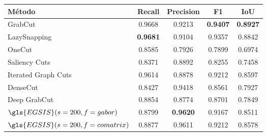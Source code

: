\begin{table}[!h]
    \centering
  \begin{tabular}{lcccc}
    \toprule
    \textbf{Método}                    & \textbf{Recall} & \textbf{Precision} & \textbf{F1}     & \textbf{IoU} \\
    \midrule \midrule
    GrabCut                            & 0.9668          & 0.9213             & \textbf{0.9407} & \textbf{0.8927}       \\
    LazySnapping                       & \textbf{0.9681} & 0.9104             & 0.9357          & 0.8842       \\
    OneCut                             & 0.8585          & 0.7926             & 0.7899          & 0.6974       \\
    Saliency Cuts                      & 0.8371          & 0.8892             & 0.8255          & 0.7458       \\
    Iterated Graph Cuts\footnotemark{} & 0.9614          & 0.8878             & 0.9212          & 0.8597       \\
    DenseCut                           & 0.8427          & 0.9418             & 0.8561          & 0.7927       \\
    Deep GrabCut                       & 0.8854          & 0.8774             & 0.8701          & 0.7849       \\
    $\gls{EGSIS}(s=200, f=gabor)$      & 0.8799          & \textbf{0.9620}    & 0.9167          & 0.8511       \\
    $\gls{EGSIS}(s=200, f=comatrix)$   & 0.8877          & 0.9611             & 0.9212          & 0.8578       \\
    \bottomrule
  \end{tabular}
\end{table}

